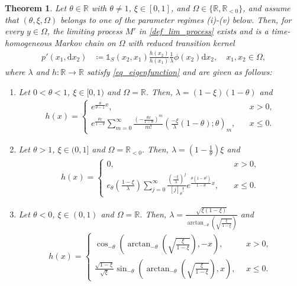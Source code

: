 \documentclass[10pt,a4paper]{amsart}
\newcommand{\R}{\mathbb{R}} %
\newcommand{\1}{\mathds{1}}
\renewcommand{\d}{\mathrm{d}}
\newtheorem{Theorem}[definition]{Theorem}
\begin{document}
\begin{Theorem}\label{maintheorem}
    Let $\theta\in\R$ with $\theta\neq1$, $\xi\in[0,1]$, and
$\Omega\in\{\R,\R_{<0}\}$, and assume that
$(\theta,\xi,\Omega)$ belongs to one of the parameter regimes
 (i)-(v) below. Then, for every $y\in\Omega$, the limiting process $M'$ in \eqref{def_lim_process} exists and is a time-homogeneous Markov chain on $\Omega$ with reduced transition kernel 
\begin{align*}
     p'(x_1,\d x_2)&\coloneqq\mathds{1}_S(x_2,x_1)\frac{h(x_2)}{h(x_1)}\frac{1}{\lambda}\phi(x_2)\d x_2,\quad x_1,x_2\in\Omega,
\end{align*}
 where $\lambda$ and $h:\R\to\R$ satisfy \eqref{eq_eigenfunction} and are given as follows:
\begin{enumerate}[label=(\roman*)]
     \item  Let $0<\theta<1$, $\xi\in [0,1)$ and $\Omega=\R$. Then, $\lambda=(1-\xi)(1-\theta)$ and
     \begin{align*}
         h(x)=\begin{cases}
          e^{\frac{\theta}{\theta-1}x},~~~&x>0,
          \\e^{\frac{\theta x}{1-\theta}}\sum_{m=0}^\infty\frac{\left(-\frac{\theta x}{1-\theta}\right)^m}{m!}\left(\frac{-\xi}{\lambda}(1-\theta);\theta\right)_m,~~~~&x\le 0.
      \end{cases}
     \end{align*}
     \item  Let $\theta>1$, $\xi\in(0,1]$ and $\Omega=\R_{<0}$. Then, $\lambda=\left(1-\frac{1}{\theta}\right)\xi$ and
     \begin{align*}
         h(x)= \begin{cases}
          0,~~~&x>0,
          \\{e_\theta\left(\frac{1-\xi}{\lambda}\right)}\sum_{j=0}^\infty \frac{\left(\frac{-\xi}{\lambda}\right)^{j}}{[j]_\theta!}e^{\frac{\theta(1-\theta^j)}{1-\theta}x},\quad &x\le0.\end{cases}
     \end{align*}
 \item Let $\theta <0$, $\xi\in(0,1)$ and $\Omega=\R$. Then, $\lambda= \frac{\sqrt{\xi(1-\xi)}}{\arctan_{-\theta}\left(\sqrt{\frac{\xi}{1-\xi}}\right)}$ and
 \begin{align*}
      h(x)=\begin{cases}
       \cos_{-\theta}\left(\arctan_{-\theta}\left(\sqrt{\frac{\xi}{1-\xi}}\right),-x\right) ,~~&x>0,
        \\\frac{\sqrt{1-\xi}}{\sqrt{\xi}}\sin_{-\theta}\left(\arctan_{-\theta}\left(\sqrt{\frac{\xi}{1-\xi}}\right),x\right),~~&x\le 0.

\end{cases}
\end{align*}
\end{enumerate}
\end{Theorem}
\end{document}
